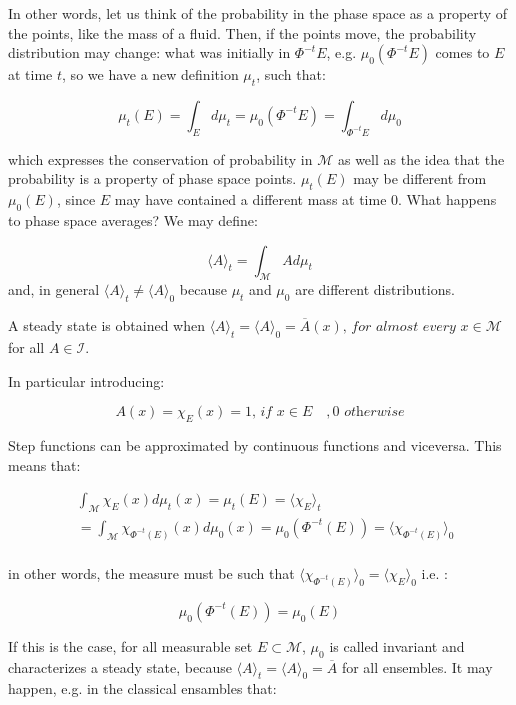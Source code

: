 \documentclass{article}
\begin{document}
In other words, let us think of the probability in the phase space as a property of the points, like the mass of a fluid. Then, if the points move, the probability distribution may change: what was initially in $ \Phi^{-t} E$, e.g. $\mu_0( \Phi^{-t} E)$ comes to $E$ at time $t$, so we have a new definition $\mu_t$, such that:

\begin{equation}
\mu_t(E) = \int_{E} d \mu_t = \mu_0( \Phi^{-t} E) = \int_{\Phi^{-t} E} d \mu_0
\end{equation}

which expresses the conservation of probability in $\mathcal{M}$ as well as the idea that the probability is a property of phase space points. $\mu_t(E)$ may be different from $\mu_0(E)$, since $E$ may have contained a different mass at time 0.
What happens to phase space averages? We may define:

$$\langle A \rangle_t = \int_{ \mathcal{M} } A d \mu_t$$
 and, in general $\langle A \rangle_t \neq \langle A \rangle_0 $ because $\mu_t$ and $\mu_0$ are different distributions.
 
 A steady state is obtained when $\langle A \rangle_t  = \langle A \rangle_0 = \overline{A}(x) \textit{, for almost every } x \in \mathcal{M}$ for all $A \in \mathcal{I}$.
 
In particular introducing:

$$ A(x) = \chi_E (x) = 1 \textit {, if } x \in E \quad,  0 \textit{ otherwise} $$

Step functions can be approximated by continuous functions and viceversa. This means that:

\begin{align*}
& \int_{ \mathcal{M} } \chi_E (x) d \mu_t(x) = \mu_t(E) = \langle \chi_E \rangle_t \\
& = \int_{ \mathcal{M} } \chi_{\Phi^{-t}(E)} (x) d \mu_0(x) = \mu_0(\Phi^{-t}(E)) = \langle \chi_{\Phi^{-t}(E)} \rangle_0 \\
\end{align*}

in other words, the measure must be such that
$ \langle \chi_{\Phi^{-t}(E)} \rangle_0 = \langle \chi_E \rangle_0$ i.e. :

\begin{equation}
\mu_0(\Phi^{-t}(E)) = \mu_0(E)
\end{equation}

If this is the case, for all measurable set $E \subset \mathcal{M} $, $\mu_0$ is called invariant and characterizes a steady state, because $\langle A \rangle_t = \langle A \rangle_0 = \overline{A} $ for all ensembles. It may happen, e.g. in the classical ensambles that:
\end{document}
